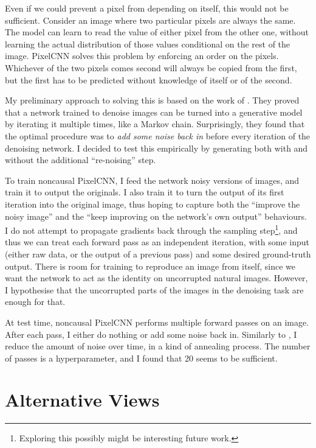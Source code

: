 \documentclass[11pt, a4paper, openany]{book}
\newcommand{\nquote}[1]{``{#1}''}
\begin{document}
Even if we could prevent a pixel from depending on itself, this would not be sufficient. Consider an image where two particular pixels are always the same. The model can learn to read the value of either pixel from the other one, without learning the actual distribution of those values conditional on the rest of the image. PixelCNN solves this problem by enforcing an order on the pixels. Whichever of the two pixels comes second will always be copied from the first, but the first has to be predicted without knowledge of itself or of the second.

My preliminary approach to solving this is based on the work of \citet{denoisinggenerative}. They proved that a network trained to denoise images can be turned into a generative model by iterating it multiple times, like a Markov chain. Surprisingly, they found that the optimal procedure was to \emph{add some noise back in} before every iteration of the denoising network. I decided to test this empirically by generating both with and without the additional \nquote{re-noising} step.

To train noncausal PixelCNN, I feed the network noisy versions of images, and train it to output the originals. I also train it to turn the output of its first iteration into the original image, thus hoping to capture both the \nquote{improve the noisy image} and the \nquote{keep improving on the network's own output} behaviours. I do not attempt to propagate gradients back through the sampling step\footnote{Exploring this possibly might be interesting future work.}, and thus we can treat each forward pass as an independent iteration, with some input (either raw data, or the output of a previous pass) and some desired ground-truth output. There is room for training to reproduce an image from itself, since we want the network to act as the identity on uncorrupted natural images. However, I hypothesise that the uncorrupted parts of the images in the denoising task are enough for that.

At test time, noncausal PixelCNN performs multiple forward passes on an image. After each pass, I either do nothing or add some noise back in. Similarly to \cite{gsnnade}, I reduce the amount of noise over time, in a kind of annealing process. The number of passes is a hyperparameter, and I found that 20 seems to be sufficient.

\section{Alternative Views}
\end{document}
